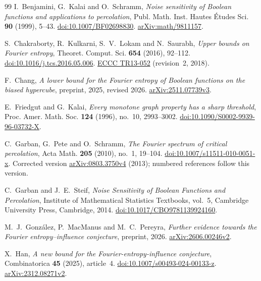 \documentclass[11pt]{amsart}
\theoremstyle{remark}
\begin{document}
\begin{thebibliography}{99}
I.~Benjamini, G.~Kalai and O.~Schramm,
\emph{Noise sensitivity of Boolean functions and applications to percolation},
Publ. Math. Inst. Hautes \'Etudes Sci. \textbf{90} (1999), 5--43.
\href{https://doi.org/10.1007/BF02698830}{doi:10.1007/BF02698830}.
\href{https://arxiv.org/abs/math/9811157}{arXiv:math/9811157}.

S.~Chakraborty, R.~Kulkarni, S.~V.~Lokam and N.~Saurabh,
\emph{Upper bounds on Fourier entropy},
Theoret. Comput. Sci. \textbf{654} (2016), 92--112.
\href{https://doi.org/10.1016/j.tcs.2016.05.006}{doi:10.1016/j.tcs.2016.05.006}.
\href{https://eccc.weizmann.ac.il/report/2013/052/}{ECCC TR13-052} (revision~2, 2018).

F.~Chang,
\emph{A lower bound for the Fourier entropy of Boolean functions on the biased hypercube},
preprint, 2025, revised 2026.
\href{https://arxiv.org/abs/2511.07739v3}{arXiv:2511.07739v3}.

E.~Friedgut and G.~Kalai,
\emph{Every monotone graph property has a sharp threshold},
Proc. Amer. Math. Soc. \textbf{124} (1996), no.~10, 2993--3002.
\href{https://doi.org/10.1090/S0002-9939-96-03732-X}{doi:10.1090/S0002-9939-96-03732-X}.

C.~Garban, G.~Pete and O.~Schramm,
\emph{The Fourier spectrum of critical percolation},
Acta Math. \textbf{205} (2010), no.~1, 19--104.
\href{https://doi.org/10.1007/s11511-010-0051-x}{doi:10.1007/s11511-010-0051-x}.
Corrected version \href{https://arxiv.org/abs/0803.3750v4}{arXiv:0803.3750v4} (2013); numbered references follow this version.

C.~Garban and J.~E.~Steif,
\emph{Noise Sensitivity of Boolean Functions and Percolation},
Institute of Mathematical Statistics Textbooks, vol.~5,
Cambridge University Press, Cambridge, 2014.
\href{https://doi.org/10.1017/CBO9781139924160}{doi:10.1017/CBO9781139924160}.

M.~J.~Gonz\'alez, P.~MacManus and M.~C.~Pereyra,
\emph{Further evidence towards the Fourier entropy--influence conjecture},
preprint, 2026.
\href{https://arxiv.org/abs/2606.00246v2}{arXiv:2606.00246v2}.

X.~Han,
\emph{A new bound for the Fourier-entropy-influence conjecture},
Combinatorica \textbf{45} (2025), article~4.
\href{https://doi.org/10.1007/s00493-024-00133-z}{doi:10.1007/s00493-024-00133-z}.
\href{https://arxiv.org/abs/2312.08271v2}{arXiv:2312.08271v2}.


\end{thebibliography}
\end{document}
